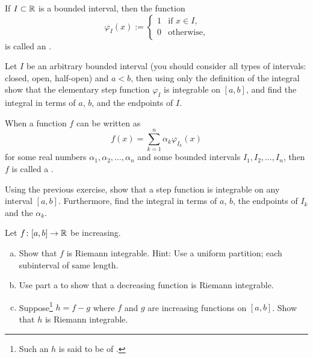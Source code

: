 \begin{exnote}
If $I \subset {\mathbb{R}}$ is a bounded interval, then
the function
\begin{equation*}
\varphi_I(x) :=
\begin{cases}
1 & \text{if $x \in I$,} \\
0 & \text{otherwise,}
\end{cases}
\end{equation*}
is called an \emph{}.
\end{exnote}

\begin{exercise}
Let $I$ be an arbitrary bounded interval (you should consider all types
of intervals: closed, open, half-open) and $a < b$, then
using only the definition of the integral
show that
the elementary step function $\varphi_I$ is integrable
on $[a,b]$, and find the integral in terms of $a$, $b$, and the
endpoints of $I$.
\end{exercise}

\begin{exnote}
When a function $f$ can be written as
\begin{equation*}
f(x) = \sum_{k=1}^n \alpha_k \varphi_{I_k} (x)
\end{equation*}
for some real numbers $\alpha_1,\alpha_2, \ldots, \alpha_n$
and some bounded intervals $I_1,I_2,\ldots,I_n$, then 
$f$ is called a \emph{}.
\end{exnote}

\begin{exercise}
Using the previous exercise, show that a step function is integrable
on any interval $[a,b]$.  Furthermore, find the integral in terms of
$a$, $b$, the endpoints of $I_k$ and the $\alpha_k$.
\end{exercise}

\begin{exercise}
\label{exercise:boundedvariationintegrable}
Let $f \colon [a,b] \to {\mathbb{R}}$ be increasing.
\begin{enumerate}[a)]
\item
Show that $f$ is Riemann
integrable.  Hint: Use a uniform partition; each subinterval of same length.
\item
Use part a to show that a decreasing function is Riemann
integrable.
\item
Suppose\footnote{Such an $h$ is said to be of \emph{}.}
$h = f-g$ where $f$ and $g$ are increasing
functions on $[a,b]$.  Show that $h$ is Riemann integrable.
\end{enumerate}
\end{exercise}


